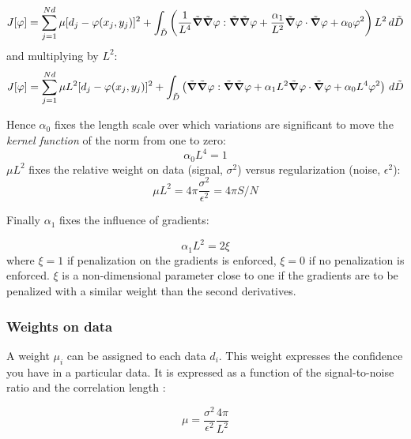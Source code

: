 \begin{equation}
J[\varphi]=\sum_{j=1}^{Nd}\mu[d_{j}-\varphi(x_{j},y_{j})]^{2}+
 \int_{\tilde{D}}\left(
\frac{1}{L^4} \tilde{\boldsymbol{\nabla}}\tilde{\boldsymbol{\nabla}}\varphi : \tilde{\boldsymbol{\nabla}}\tilde{\boldsymbol{\nabla}}\varphi + \frac{\alpha_{1}}{L^2}
\tilde{\boldsymbol{\nabla}}\varphi \cdot \tilde{\boldsymbol{\nabla}}\varphi + \alpha_{0} \varphi^{2} \right) L^2\,d\tilde{D}
\end{equation}
and multiplying by $L^{2}$:
\begin{equation}
{J}[\varphi]=\sum_{j=1}^{Nd}\mu L^2 [d_{j}-\varphi(x_{j},y_{j})]^{2}+
 \int_{\tilde{D}}\left(
 \tilde{\boldsymbol{\nabla}}\tilde{\boldsymbol{\nabla}}\varphi : \tilde{\boldsymbol{\nabla}}\tilde{\boldsymbol{\nabla}}\varphi + { \alpha_{1} L^2}
\tilde{\boldsymbol{\nabla}}\varphi \cdot \tilde{\boldsymbol{\nabla}}\varphi + \alpha_{0} L^4 \varphi^{2} \right) \,d\tilde{D}
\label{divaformulaadim}
\end{equation}


Hence $\alpha_0$ fixes the length scale over which variations are significant to move the \textit{kernel function} of the norm from one to zero:
\begin{equation}
\alpha_0 L^4 = 1
\end{equation}
$ \mu L^2$ fixes the relative weight on data (signal, $\sigma^2$) versus regularization (noise, $\epsilon^2$):
\begin{equation}
\mu L^2= 4 \pi \frac{\sigma^2}{\epsilon^2}= 4 \pi S/N 
\label{defmu}
\end{equation}

Finally  $\alpha_1$ fixes the influence of gradients:

\begin{equation}
\alpha_1 L^2 = 2 \xi
\end{equation}
where $\xi=1$ if penalization on the gradients is enforced, $\xi=0$ if no penalization is enforced. $\xi$ is a non-dimensional parameter close to one if the gradients are to be penalized with a similar weight than the second derivatives.


\subsubsection{Weights on data}

A weight $\mu_i$ can be assigned to each data $d_i$. This weight expresses the confidence you have in a particular data. It is expressed as a function of the signal-to-noise ratio and the correlation length \cite{BRANKART96}: 

\begin{equation}
\mu=\frac{\sigma^{2}}{\epsilon^{2}} \frac{4 \pi}{L^{2}}
\end{equation}


